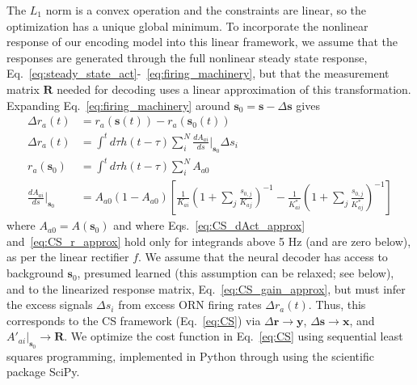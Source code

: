 \documentclass[9pt,twoside,lineno]{pnas-new}
\begin{document}
The $L_1$ norm is a convex operation and the constraints are linear, so the optimization has a unique global minimum. To incorporate the nonlinear response of our encoding model into this linear framework, we assume that the responses are generated through the full nonlinear steady state response, Eq.~\ref{eq:steady_state_act}-~\ref{eq:firing_machinery}, but that the measurement matrix $\mathbf R$ needed for decoding uses a linear approximation of this transformation.  Expanding Eq.~\ref{eq:firing_machinery} around $\mathbf s_0 = \mathbf s - \Delta \mathbf s$ gives
\begin{align}
\Delta r_a(t) &= r_a(\mathbf s(t)) - r_a(\mathbf s_0(t)) \\
\Delta r_a(t) &= \int^t d\tau h(t- \tau)\sum_i^N\frac{dA_{ai}}{ds}\big|_{\mathbf s_0}\Delta s_i \label{eq:CS_dAct_approx}\\
r_a(\mathbf s_0) &= \int^t d\tau h(t- \tau)\sum_i^NA_{a0} \label{eq:CS_r_approx} \\
\frac{dA_{ai}}{ds}\bigg|_{\mathbf s_0} &=  %
A_{a0}(1 - A_{a0})
\left[
\frac{1}{K_{ai}}\left(1 + \sum_j \frac{s_{0,j}}{K_{aj}}\right)^{-1}
-\frac{1}{K^*_{ai}}\left(1 + \sum_j \frac{s_{0, j}}{K^*_{aj}}\right)^{-1}
\right]
\label{eq:CS_gain_approx}
\end{align}
where $A_{a0} = A(\mathbf {s}_0)$ and where Eqs.~\ref{eq:CS_dAct_approx} and~\ref{eq:CS_r_approx} hold only for integrands above 5 Hz (and are zero below), as per the linear rectifier $f$. We assume that the neural decoder has access to background $\mathbf s_0$, presumed learned (this assumption can be relaxed; see below), and to  the linearized response matrix, Eq.~\ref{eq:CS_gain_approx}, but must infer the excess signals $\Delta s_i$ from excess ORN firing rates $\Delta r_a(t)$. Thus, this corresponds to the CS framework (Eq.~\ref{eq:CS})  via $\Delta \mathbf {r} \rightarrow \mathbf y$, $\Delta \mathbf s \rightarrow \mathbf x$, and $A'_{ai}\big|_{\mathbf s_0} \rightarrow \mathbf R$. We optimize the cost function in Eq.~\ref{eq:CS} using sequential least squares programming, implemented in Python through using the scientific package SciPy. 

\end{document}
